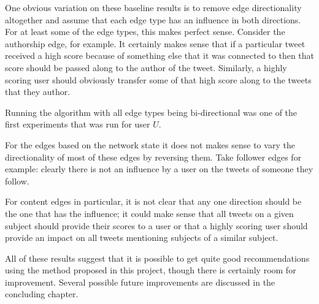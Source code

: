 One obvious variation on these baseline results is to remove edge directionality altogether and assume that each edge type has an influence in both directions. For at least some of the edge types, this makes perfect sense. Consider the authorship edge, for example. It certainly makes sense that if a particular tweet received a high score because of something else that it was connected to then that score should be passed along to the author of the tweet. Similarly, a highly scoring user should obviously transfer some of that high score along to the tweets that they author.

Running the algorithm with all edge types being bi-directional was one of the first experiments that was run for user $U$. 


For the edges based on the network state it does not makes sense to vary the directionality of most of these edges by reversing them. Take follower edges for example: clearly there is not an influence by a user on the tweets of someone they follow. 

For content edges in particular, it is not clear that any one direction should be the one that has the influence; it could make sense that all tweets on a given subject should provide their scores to a user or that a highly scoring user should provide an impact on all tweets mentioning subjects of a similar subject.



All of these results suggest that it is possible to get quite good recommendations using the method proposed in this project, though there is certainly room for improvement. Several possible future improvements are discussed in the concluding chapter.






